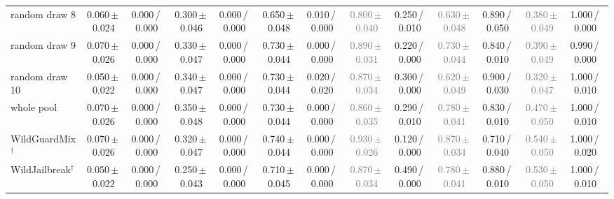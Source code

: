 \begin{tabular}{@{}lcccccccccccc@{}}
random draw 8 & 0.060\,{\scriptsize$\pm$\,0.024} & {\scriptsize 0.000\,/\,0.000} & 0.300\,{\scriptsize$\pm$\,0.046} & {\scriptsize 0.000\,/\,0.000} & 0.650\,{\scriptsize$\pm$\,0.048} & {\scriptsize 0.010\,/\,0.000} & \textcolor{gray}{0.800\,{\scriptsize$\pm$\,0.040}} & {\scriptsize 0.250\,/\,0.010} & \textcolor{gray}{0.630\,{\scriptsize$\pm$\,0.048}} & {\scriptsize 0.890\,/\,0.050} & \textcolor{gray}{0.380\,{\scriptsize$\pm$\,0.049}} & {\scriptsize 1.000\,/\,0.000} \\
random draw 9 & 0.070\,{\scriptsize$\pm$\,0.026} & {\scriptsize 0.000\,/\,0.000} & 0.330\,{\scriptsize$\pm$\,0.047} & {\scriptsize 0.000\,/\,0.000} & 0.730\,{\scriptsize$\pm$\,0.044} & {\scriptsize 0.000\,/\,0.000} & \textcolor{gray}{0.890\,{\scriptsize$\pm$\,0.031}} & {\scriptsize 0.220\,/\,0.000} & \textcolor{gray}{0.730\,{\scriptsize$\pm$\,0.044}} & {\scriptsize 0.840\,/\,0.010} & \textcolor{gray}{0.390\,{\scriptsize$\pm$\,0.049}} & {\scriptsize 0.990\,/\,0.000} \\
random draw 10 & 0.050\,{\scriptsize$\pm$\,0.022} & {\scriptsize 0.000\,/\,0.000} & 0.340\,{\scriptsize$\pm$\,0.047} & {\scriptsize 0.000\,/\,0.000} & 0.730\,{\scriptsize$\pm$\,0.044} & {\scriptsize 0.020\,/\,0.020} & \textcolor{gray}{0.870\,{\scriptsize$\pm$\,0.034}} & {\scriptsize 0.300\,/\,0.000} & \textcolor{gray}{0.620\,{\scriptsize$\pm$\,0.049}} & {\scriptsize 0.900\,/\,0.030} & \textcolor{gray}{0.320\,{\scriptsize$\pm$\,0.047}} & {\scriptsize 1.000\,/\,0.010} \\
whole pool & 0.070\,{\scriptsize$\pm$\,0.026} & {\scriptsize 0.000\,/\,0.000} & 0.350\,{\scriptsize$\pm$\,0.048} & {\scriptsize 0.000\,/\,0.000} & 0.730\,{\scriptsize$\pm$\,0.044} & {\scriptsize 0.000\,/\,0.000} & \textcolor{gray}{0.860\,{\scriptsize$\pm$\,0.035}} & {\scriptsize 0.290\,/\,0.010} & \textcolor{gray}{0.780\,{\scriptsize$\pm$\,0.041}} & {\scriptsize 0.830\,/\,0.010} & \textcolor{gray}{0.470\,{\scriptsize$\pm$\,0.050}} & {\scriptsize 1.000\,/\,0.010} \\
WildGuardMix$^\dagger$ & 0.070\,{\scriptsize$\pm$\,0.026} & {\scriptsize 0.000\,/\,0.000} & 0.320\,{\scriptsize$\pm$\,0.047} & {\scriptsize 0.000\,/\,0.000} & 0.740\,{\scriptsize$\pm$\,0.044} & {\scriptsize 0.000\,/\,0.000} & \textcolor{gray}{0.930\,{\scriptsize$\pm$\,0.026}} & {\scriptsize 0.120\,/\,0.000} & \textcolor{gray}{0.870\,{\scriptsize$\pm$\,0.034}} & {\scriptsize 0.710\,/\,0.040} & \textcolor{gray}{0.540\,{\scriptsize$\pm$\,0.050}} & {\scriptsize 1.000\,/\,0.020} \\
WildJailbreak$^\dagger$ & 0.050\,{\scriptsize$\pm$\,0.022} & {\scriptsize 0.000\,/\,0.000} & 0.250\,{\scriptsize$\pm$\,0.043} & {\scriptsize 0.000\,/\,0.000} & 0.710\,{\scriptsize$\pm$\,0.045} & {\scriptsize 0.000\,/\,0.000} & \textcolor{gray}{0.870\,{\scriptsize$\pm$\,0.034}} & {\scriptsize 0.490\,/\,0.000} & \textcolor{gray}{0.780\,{\scriptsize$\pm$\,0.041}} & {\scriptsize 0.880\,/\,0.010} & \textcolor{gray}{0.530\,{\scriptsize$\pm$\,0.050}} & {\scriptsize 1.000\,/\,0.010} \\

\end{tabular}
